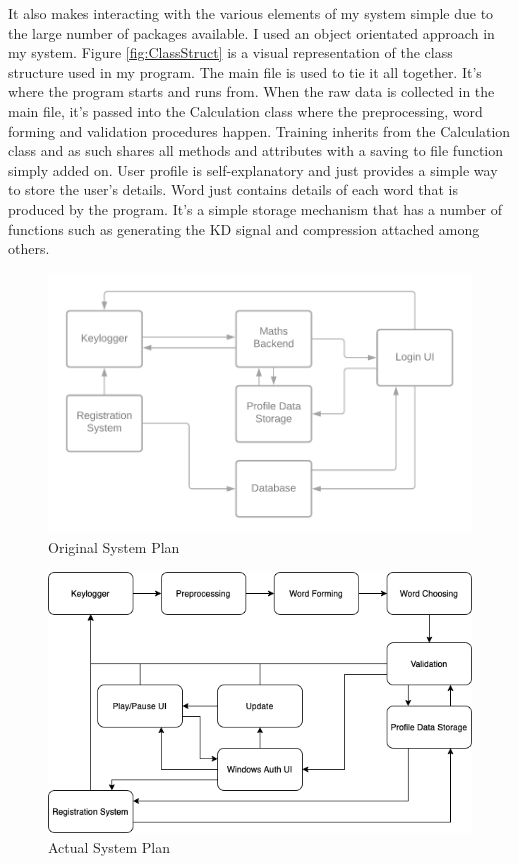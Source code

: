 \documentclass[10pt,a4paper]{report}
\begin{document}
It also makes interacting with the various elements of my system simple due to the large number of packages available. I used an object orientated approach in my system. Figure \ref{fig:ClassStruct} is a visual representation of the class structure used in my program. The main file is used to tie it all together. It's where the program starts and runs from. When the raw data is collected in the main file, it's passed into the Calculation class where the preprocessing, word forming and validation procedures happen. Training inherits from the Calculation class and as such shares all methods and attributes with a saving to file function simply added on.  User profile is self-explanatory and just provides a simple way to store the user's details. Word just contains details of each word that is produced by the program. It's a simple storage mechanism that has a number of functions such as generating the KD signal and compression attached among others.

\begin{figure}
	\includegraphics[scale=0.7]{OldPlan}
	\caption{Original System Plan}
	\label{fig:OldPlan}
\end{figure}

\begin{figure}
	\includegraphics[scale=0.55]{SystemPlan}
	\caption{Actual System Plan}
	\label{fig:NewPlan}
\end{figure}
\end{document}
